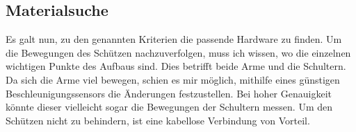 \subsection{Materialsuche}
Es galt nun, zu den genannten Kriterien die passende Hardware zu finden. Um die Bewegungen des 
Schützen nachzuverfolgen, muss ich wissen, wo die einzelnen wichtigen Punkte des Aufbaus 
sind. Dies betrifft beide Arme und die Schultern. Da sich die Arme viel bewegen, schien es mir 
möglich, mithilfe eines günstigen Beschleunigungssensors die Änderungen festzustellen. Bei 
hoher Genauigkeit könnte dieser vielleicht sogar die Bewegungen der Schultern messen.
Um den Schützen nicht zu behindern, ist eine kabellose Verbindung von Vorteil.

